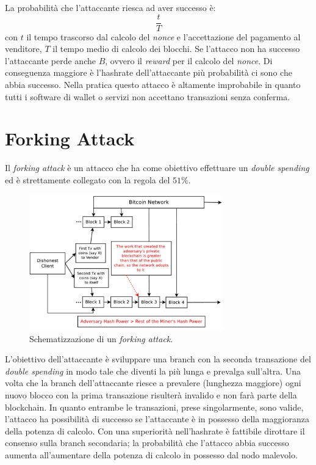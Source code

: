La probabilità che l'attaccante riesca ad aver successo è:
\begin{equation}
    \frac{t}{T}
\end{equation}
con $t$ il tempo trascorso dal calcolo del \textit{nonce} e l'accettazione del pagamento al venditore, $T$ il tempo medio di calcolo dei blocchi. Se l'attacco non ha successo l'attaccante perde anche $B$, ovvero il \textit{reward} per il calcolo del \textit{nonce}.\newline
Di conseguenza maggiore è l'hashrate dell'attaccante più probabilità ci sono che abbia successo. Nella pratica questo attacco è altamente improbabile in quanto tutti i software di wallet o servizi non accettano transazioni senza conferma.

\section{Forking Attack}
Il \textit{forking attack} è un attacco che ha come obiettivo effettuare un \textit{double spending} ed è strettamente collegato con la regola del $51\%$.
\begin{figure}[H]
    \centering
    \includegraphics[width=0.75\textwidth]{images/forkingattack.png}
    \caption{Schematizzazione di un \textit{forking attack}.}
\end{figure}
L'obiettivo dell'attaccante è sviluppare una branch con la seconda transazione del \textit{double spending} in modo tale che diventi la più lunga e prevalga sull'altra. Una volta che la branch dell'attaccante riesce a prevalere (lunghezza maggiore) ogni nuovo blocco con la prima transazione risulterà invalido e non farà parte della blockchain.\newline
In quanto entrambe le transazioni, prese singolarmente, sono valide, l'attacco ha possibilità di successo se l'attaccante è in possesso della maggioranza della potenza di calcolo. Con una superiorità nell'hashrate è fattibile dirottare il consenso sulla branch secondaria; la probabilità che l'attacco abbia successo aumenta all'aumentare della potenza di calcolo in possesso dal nodo malevolo.
